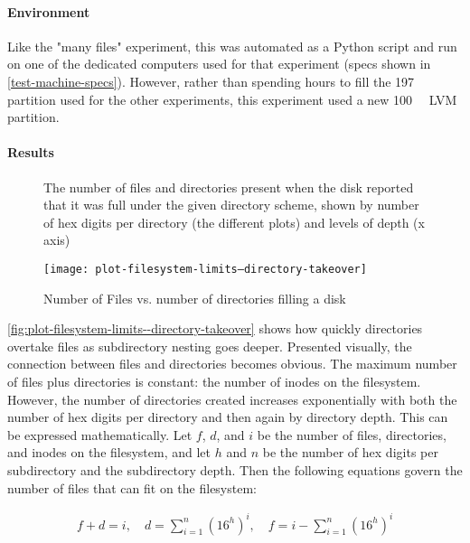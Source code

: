 \paragraph{Environment}

Like the "many files" experiment, this was automated as a Python script and run
on one of the dedicated computers used for that experiment (specs shown in
\autoref{test-machine-specs}). However, rather than spending hours to fill the
\SI{197}{\gibi\byte} partition used for the other experiments, this experiment
used a new \SI{100}{\mebi\byte} LVM partition.

\paragraph{Results}
\label{seek-times-results}

\begin{figure}[]
    \caption{Number of Files vs. number of directories filling a disk}
    \label{fig:plot-filesystem-limits--directory-takeover}
    \centering

    The number of files and directories present when the disk reported that it
    was full under the given directory scheme, shown by number of hex digits per
    directory (the different plots) and levels of depth (x axis)

    \texttt{[image: plot-filesystem-limits--directory-takeover]}
\end{figure}

\autoref{fig:plot-filesystem-limits--directory-takeover} shows how quickly
directories overtake files as subdirectory nesting goes deeper. Presented
visually, the connection between files and directories becomes obvious. The
maximum number of files plus directories is constant: the number of inodes on
the filesystem. However, the number of directories created increases
exponentially with both the number of hex digits per directory and then again by
directory depth. This can be expressed mathematically. Let $f$, $d$, and $i$ be
the number of files, directories, and inodes on the filesystem, and let $h$ and
$n$ be the number of hex digits per subdirectory and the subdirectory depth.
Then the following equations govern the number of files that can fit on the
filesystem:


\begin{equation*}
    \begin{aligned}
        f+d = i, \quad
        d = \sum_{i=1}^n \left( 16^h \right)^i, \quad
        f = i - \sum_{i=1}^n \left( 16^h \right)^i
    \end{aligned}
\end{equation*}

